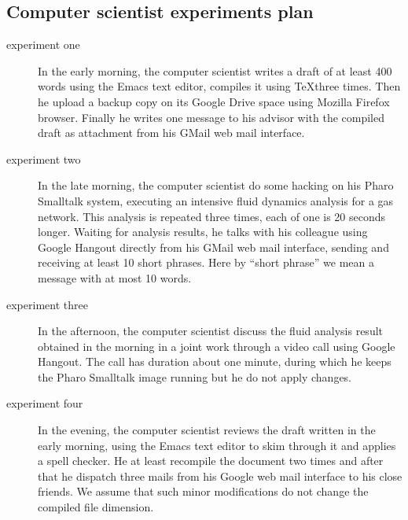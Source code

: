 \documentclass[10pt,a4paper]{article}
\begin{document}
    \subsection{Computer scientist experiments plan}
    \begin{description}
    \item[experiment one] In the early morning, the computer scientist
      writes a draft of at least 400 words using the Emacs text
      editor, compiles it using \TeX three times. Then he upload a
      backup copy on its Google Drive space using Mozilla Firefox
      browser. Finally he writes one message to his advisor with the
      compiled draft as attachment from his GMail web mail interface.
    \item[experiment two] In the late morning, the computer scientist
      do some hacking on his Pharo Smalltalk system, executing an
      intensive fluid dynamics analysis for a gas network. This
      analysis is repeated three times, each of one is 20 seconds
      longer. Waiting for analysis results, he talks with his
      colleague using Google Hangout directly from his GMail web mail
      interface, sending and receiving at least 10 short phrases. Here
      by ``short phrase'' we mean a message with at most 10 words.
    \item[experiment three] In the afternoon, the computer scientist
      discuss the fluid analysis result obtained in the morning in a
      joint work through a video call using Google Hangout. The call
      has duration about one minute, during which he keeps the Pharo
      Smalltalk image running but he do not apply changes.
    \item[experiment four] In the evening, the computer scientist
      reviews the draft written in the early morning, using the Emacs
      text editor to skim through it and applies a spell checker. He
      at least recompile the document two times and after that he
      dispatch three mails from his Google web mail interface to his
      close friends. We assume that such minor modifications do not
      change the compiled file dimension.
    \end{description}
\end{document}
